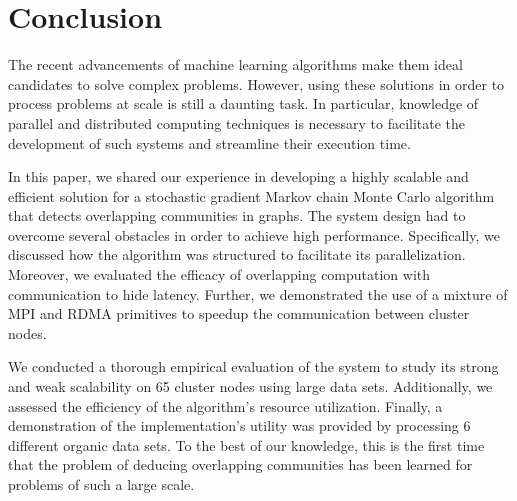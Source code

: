 \section{Conclusion}

The recent advancements of machine learning algorithms make them ideal
candidates to solve complex problems. However, using these solutions in order
to process problems at scale is still a daunting task. In particular, knowledge
of parallel and distributed computing techniques is necessary to facilitate the
development of such systems and streamline their execution time.

In this paper, we shared our experience in developing a highly scalable and
efficient solution for a stochastic gradient Markov chain Monte Carlo algorithm
that detects overlapping communities in graphs. The system design had to
overcome several obstacles in order to achieve high performance. Specifically,
we discussed how the algorithm was structured to facilitate its
parallelization. Moreover, we evaluated the efficacy of overlapping computation
with communication to hide latency.  Further, we demonstrated the use of a
mixture of MPI and RDMA primitives to speedup the communication between cluster
nodes.

We conducted a thorough empirical evaluation of the system to study its strong
and weak scalability on 65 cluster nodes using large data sets.  Additionally,
we assessed the efficiency of the algorithm's resource utilization. Finally, a
demonstration of the implementation's utility was provided by processing 6
different organic data sets.
To the best of
our knowledge, this is the first time that the problem of deducing overlapping
communities has been learned for problems of such a large scale.
